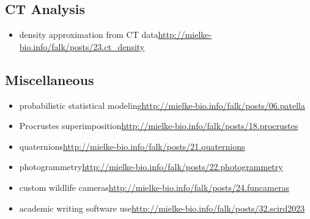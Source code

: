 \begin{change}
\subsection{CT Analysis}
\label{sec:org7383abe}
\begin{itemize}
\item density approximation from CT data\newline \url{http://mielke-bio.info/falk/posts/23.ct\_density}
\end{itemize}

\subsection{Miscellaneous}
\label{sec:org43dddbd}
\begin{itemize}
\item probabilistic statistical modeling\newline \url{http://mielke-bio.info/falk/posts/06.patella}
\item Procrustes superimposition\newline \url{http://mielke-bio.info/falk/posts/18.procrustes}
\item quaternions\newline \url{http://mielke-bio.info/falk/posts/21.quaternions}
\item photogrammetry\newline \url{http://mielke-bio.info/falk/posts/22.photogrammetry}
\item custom wildlife cameras\newline \url{http://mielke-bio.info/falk/posts/24.funcameras}
\item academic writing software use\newline \url{http://mielke-bio.info/falk/posts/32.scird2023}
\end{itemize}

\end{change}
